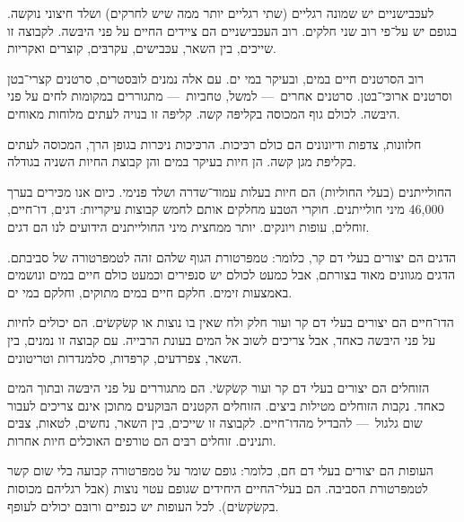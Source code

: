 לעכּבישניים יש שמונה רגליים (שתי רגליים יותר ממה שיש לחרקים) ושלד חיצוני נוקשה. בגופם יש על־פי רוב שני חלקים. רוב העכּבישניים הם ציידים החיים על פני היבּשה. לקבוצה זו שייכים, בין השאר, עכּבישים, עקרבּים, קוצרים ואקריות.



רוב הסרטנים חיים במים, ובעיקר במי ים. עם אלה נמנים לובּסטרים, סרטנים קצרי־בטן וסרטנים ארוכּי־בטן. סרטנים אחרים~— למשל, טחביות~— מתגוררים במקומות לחים על פני היבּשה. לכולם גוף המכוסה בקליפּה קשה. קליפּה זו בנויה לעתים מלוחות מאוחים.



חלזונות, צדפות ודיונונים הם כולם רכּיכות. הרכּיכות ניכּרות בגופן הרך, המכוסה לעתים בקליפּת מגן קשה. הן חיות בעיקר במים והן קבוצת החיות השניה בגודלה.



החולייתנים (בעלי החוליות) הם חיות בעלות עמוד־שדרה ושלד פנימי. כיום אנו מכּירים בערך 46,000 מיני חולייתנים. חוקרי הטבע מחלקים אותם לחמש קבוצות עיקריות: דגים, דו־חיים, זוחלים, עופות ויונקים. יותר ממחצית מיני החולייתנים הידועים לנו הם דגים.



הדגים הם יצורים בעלי דם קר, כלומר: טמפּרטורת הגוף שלהם זהה לטמפּרטורה של סביבתם. הדגים מגוונים מאוד בצורתם, אבל כמעט לכולם יש סנפּירים וכמעט כולם חיים במים ונושמים באמצעות זימים. חלקם חיים במים מתוקים, וחלקם במי ים.



הדו־חיים הם יצורים בעלי דם קר ועור חלק ולח שאין בו נוצות או קשׂקשׂים. הם יכולים לחיות על פני היבּשה  כאחד, אבל צריכים לשוב אל המים בעונת הרבייה. עם קבוצה זו נמנים, בין השאר, צפרדעים, קרפּדות, סלמנדרות וטריטונים.



הזוחלים הם יצורים בעלי דם קר ועור קשׂקשׂי. הם מתגוררים על פני היבּשה ובתוך המים כאחד. נקבות הזוחלים מטילות ביצים. הזוחלים הקטנים הבּוקעים מתוכן אינם צריכים לעבור שום גלגול~— להבדיל מהדו־חיים. לקבוצה זו שייכים, בין השאר, נחשים, לטאות, צבּים ותנינים. זוחלים רבּים הם טורפים האוכלים חיות אחרות.



העופות הם יצורים בעלי דם חם, כלומר: גופם שומר על טמפּרטורה קבועה בלי שום קשר לטמפּרטורת הסביבה. הם בעלי־החיים היחידים שגופם עטוי נוצות (אבל רגליהם מכוסות בקשׂקשׂים). לכל העופות יש כנפיים ורובּם יכולים לעופף.


